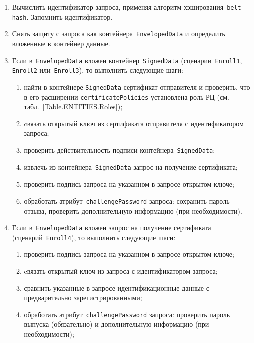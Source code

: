 \begin{enumerate}
\item
Вычислить идентификатор запроса, применяя 
алгоритм хэширования~\texttt{belt-hash}. 
Запомнить идентификатор.

\item
Снять защиту с запроса как контейнера~\texttt{EnvelopedData} 
и определить вложенные в контейнер данные.

\item
Если в~\texttt{EnvelopedData} вложен контейнер~\texttt{SignedData}
(сценарии~\texttt{Enroll1}, \texttt{Enroll2} или~\texttt{Enroll3}), 
то выполнить следующие шаги:

\begin{enumerate}
\item
найти в контейнере \texttt{SignedData} сертификат отправителя
и проверить, что в его расширении \texttt{certificatePolicies} 
установлена роль РЦ (см. табл.~\ref{Table.ENTITIES.Roles});
\item
cвязать открытый ключ из сертификата отправителя с идентификатором 
запроса;
\item
проверить действительность подписи контейнера~\texttt{SignedData};
\item
извлечь из контейнера~\texttt{SignedData} запрос на получение сертификата;
\item
проверить подпись запроса на указанном в запросе открытом ключе;
\item
обработать атрибут~\texttt{challengePassword} запроса:
сохранить пароль отзыва, проверить дополнительную информацию
(при необходимости).
\end{enumerate}

\item
Если в~\texttt{EnvelopedData} вложен запрос на получение сертификата
(сценарий~\texttt{Enroll4}), то выполнить следующие шаги:
\begin{enumerate}
\item
проверить подпись запроса на указанном в запросе открытом ключе;
\item
cвязать открытый ключ из запроса с идентификатором запроса;
\item
сравнить указанные в запросе идентификационные данные с предварительно
зарегистрированными;
\item
обработать атрибут~\texttt{challengePassword} запроса:
проверить пароль выпуска (обязательно) и  
дополнительную информацию (при необходимости);
\end{enumerate}


\end{enumerate}
